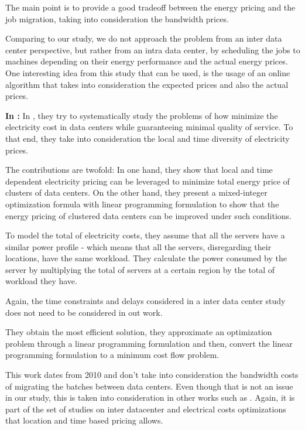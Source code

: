 The main point is to provide a good tradeoff between the energy pricing and the
job migration, taking into consideration the bandwidth prices.

Comparing to our study, we do not approach the problem from an inter data center
perspective, but rather from an intra data center, by scheduling the jobs to
machines depending on their energy performance and the actual energy prices. One
interesting idea from this study that can be used, is the usage of an online
algorithm that takes into consideration the expected prices and also the actual
prices.


\textbf{In \cite{MINIMIZING_DIST}:}
In \cite{MINIMIZING_DIST}, they try to systematically study the problems of how
minimize the electricity cost in data centers while guaranteeing minimal quality
of service. To that end, they take into consideration the local and time diversity 
of electricity prices.

The contributions are twofold: In one hand, they show that local and time
dependent electricity pricing can be leveraged to minimize total energy price
of clusters of data centers. On the other hand, they present a mixed-integer
optimization formula with linear programming formulation to show that the energy
pricing of clustered data centers can be improved under such conditions.

To model the total of electricity costs, they assume that all the servers have a
similar power profile - which means that all the servers, disregarding their
locations, have the same workload. They calculate the power consumed by the
server by multiplying the total of servers at a certain region by the total of
workload they have. 

Again, the time constraints and delays considered in a inter data center study
does not need to be considered in out work.

They obtain the most efficient solution, they approximate an optimization
problem through a linear programming formulation and then, convert the linear
programming formulation to a minimum cost flow problem. 

This work dates from 2010 and don't take into consideration the bandwidth costs
of migrating the batches between data centers. Even though that is not an issue
in our study, this is taken into consideration in other works such as
\cite{MIGRATION_CLOUD}. Again, it is part of the set of studies on inter
datacenter and electrical costs optimizations that location and time based 
pricing allows.



